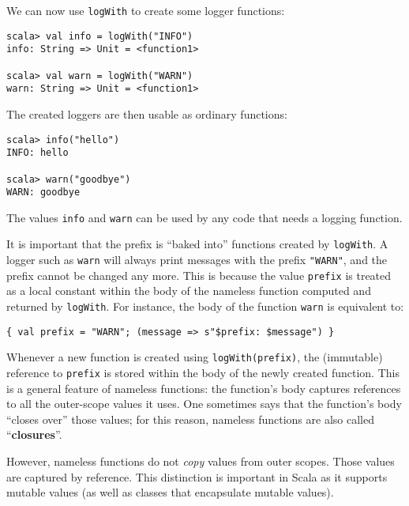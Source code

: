 We can now use \lstinline!logWith! to create some logger functions:
\begin{lstlisting}
scala> val info = logWith("INFO")
info: String => Unit = <function1>

scala> val warn = logWith("WARN")
warn: String => Unit = <function1>
\end{lstlisting}
The created loggers are then usable as ordinary functions:
\begin{lstlisting}
scala> info("hello")
INFO: hello

scala> warn("goodbye")
WARN: goodbye
\end{lstlisting}
The values \lstinline!info! and \lstinline!warn! can be used by
any code that needs a logging function.

It is important that the prefix is \textsf{``}baked into\textsf{''} functions created
by \lstinline!logWith!. A logger such as \lstinline!warn! will always
print messages with the prefix \lstinline!"WARN"!, and the prefix
cannot be changed any more. This is because the value \lstinline!prefix!
is treated as a local constant within the body of the nameless function
computed and returned by \lstinline!logWith!. For instance, the body
of the function \lstinline!warn! is equivalent to:
\begin{lstlisting}
{ val prefix = "WARN"; (message => s"$prefix: $message") }
\end{lstlisting}
Whenever a new function is created using \lstinline!logWith(prefix)!,
the (immutable) reference to \lstinline!prefix! is stored within
the body of the newly created function. This is a general feature
of nameless functions: the function\textsf{'}s body captures references to
all the outer-scope values it uses. One sometimes says that the function\textsf{'}s
body \textsf{``}closes over\textsf{''} those values; for this reason, nameless functions
are also called \textsf{``}\textbf{closures}\textsf{''}. 

However, nameless functions do not \emph{copy} values from outer scopes.
Those values are captured by reference. This distinction is important
in Scala as it supports mutable values (as well as classes that encapsulate
mutable values).

